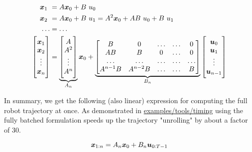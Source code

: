 \begin{align}
\x_1 &= A \x_0 + B \ u_0 \\
\x_2 &= A \x_0 + B \ u_1 = A^2 \x_0 + A B \ u_0 + B \ u_1\\ 
\hdots &= \hdots \\
\begin{bmatrix} \x_1 \\ \x_2 \\ \vdots \\ \x_n \end{bmatrix} &= \underbrace{\begin{bmatrix} A \\ A^2 \\ \vdots \\ A^n \end{bmatrix}}_{\substack{A_n}} \x_0 + \underbrace{\begin{bmatrix} B & 0 & \hdots & \hdots & 0 \\ AB & B & 0 & \hdots & 0 \\ \hdots & \hdots & \hdots & \hdots & \hdots \\ A^{n-1} B & A^{n-2} B & \hdots & \hdots & B \end{bmatrix}}_{\substack{B_n}} \begin{bmatrix} \u_0 \\ \u_1 \\ \vdots \\ \u_{n-1} \end{bmatrix}
\end{align}

In summary, we get the following (also linear) expression for computing the full robot trajectory at once. As demonstrated in \href{https://github.com/simon-schaefer/mantrap/blob/master/examples/timing.ipynb}{examples/tools/timing} using the fully batched formulation speeds up the trajectory "unrolling" by about a factor of 30.  

\begin{equation}
\boldsymbol{x}_{1:n} = A_n \boldsymbol{x}_0 + B_n \boldsymbol{u}_{0:T-1}
\label{eq:dynamics_stacked}
\end{equation}
